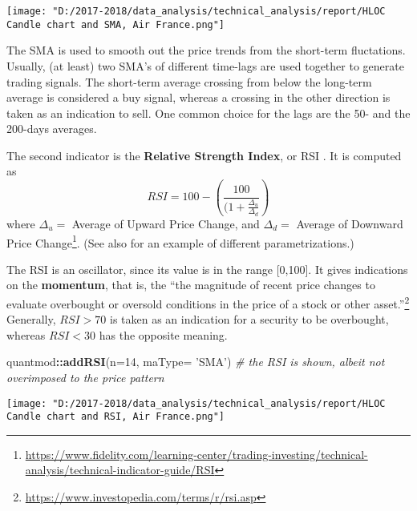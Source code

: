 \documentclass[
  11pt,
]{article}
\newenvironment{Shaded}{\begin{snugshade}}{\end{snugshade}}
\newcommand{\CommentTok}[1]{\textcolor[rgb]{0.56,0.35,0.01}{\textit{#1}}}
\newcommand{\DataTypeTok}[1]{\textcolor[rgb]{0.13,0.29,0.53}{#1}}
\newcommand{\DecValTok}[1]{\textcolor[rgb]{0.00,0.00,0.81}{#1}}
\newcommand{\KeywordTok}[1]{\textcolor[rgb]{0.13,0.29,0.53}{\textbf{#1}}}
\newcommand{\NormalTok}[1]{#1}
\newcommand{\OperatorTok}[1]{\textcolor[rgb]{0.81,0.36,0.00}{\textbf{#1}}}
\newcommand{\StringTok}[1]{\textcolor[rgb]{0.31,0.60,0.02}{#1}}
\let\origfigure\figure
\let\endorigfigure\endfigure
\renewenvironment{figure}[1][2] {
    \expandafter\origfigure\expandafter[H]
} {
    \endorigfigure
}
\begin{document}
\begin{figure}
\centering
\texttt{[image: "D:/2017-2018/data\_analysis/technical\_analysis/report/HLOC Candle chart and SMA, Air France.png"]}
\caption{Daily HLOC Chart price, with SMA(50) in blu, and SMA(200) in
purple.}
\end{figure}

The SMA is used to smooth out the price trends from the short-term
fluctations. Usually, (at least) two SMA's of different time-lags are
used together to generate trading signals. The short-term average
crossing from below the long-term average is considered a buy signal,
whereas a crossing in the other direction is taken as an indication to
sell. One common choice for the lags are the 50- and the 200-days
averages.

The second indicator is the \textbf{Relative Strength Index}, or RSI .
It is computed as\\
\begin{equation} 
RSI = 100 - \left( \frac{100}{(1 + \frac{\Delta_u}{\Delta_d} } \right) 
\end{equation} where \(\Delta_u =\) Average of Upward Price Change, and
\(\Delta_d =\) Average of Downward Price Change\footnote{\url{https://www.fidelity.com/learning-center/trading-investing/technical-analysis/technical-indicator-guide/RSI}}.
(See also \citet{Hsu2016} for an example of different parametrizations.)

The RSI is an oscillator, since its value is in the range {[}0,100{]}.
It gives indications on the \textbf{momentum}, that is, the ``the
magnitude of recent price changes to evaluate overbought or oversold
conditions in the price of a stock or other asset.''\footnote{\url{https://www.investopedia.com/terms/r/rsi.asp}}
Generally, \(RSI>70\) is taken as an indication for a security to be
overbought, whereas \(RSI < 30\) has the opposite meaning.

\begin{Shaded}
\begin{Highlighting}[]
\NormalTok{quantmod}\OperatorTok{::}\KeywordTok{addRSI}\NormalTok{(}\DataTypeTok{n=}\DecValTok{14}\NormalTok{, }\DataTypeTok{maType=} \StringTok{'SMA'}\NormalTok{) }
\CommentTok{# the RSI is shown, albeit not overimposed to the price pattern}
\end{Highlighting}
\end{Shaded}

\begin{figure}
\centering
\texttt{[image: "D:/2017-2018/data\_analysis/technical\_analysis/report/HLOC Candle chart and RSI, Air France.png"]}
\caption{Daily HLOC Chart price with RSI(14)}
\end{figure}
\end{document}
